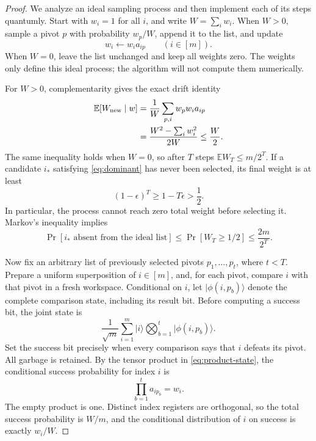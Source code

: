 \documentclass[11pt]{article}
\theoremstyle{definition}
\newcommand{\E}{\mathbb E}
\begin{document}
\begin{proof}
We analyze an ideal sampling process and then implement each of its
steps quantumly. Start with $w_i=1$ for all $i$, and write $W=\sum_iw_i$.
When $W>0$, sample a pivot $p$ with probability $w_p/W$, append it to
the list, and update
\begin{equation}\label{eq:weights}
 w_i\longleftarrow w_i a_{ip}\qquad(i\in[m]).
\end{equation}
When $W=0$, leave the list unchanged and keep all weights zero. The
weights only define this ideal process; the algorithm will not compute
them numerically.

For $W>0$, complementarity gives the exact drift identity
\begin{align}
 \E[W_{\mathrm{new}}\mid w]
 &=\frac{1}{W}\sum_{p,i}w_pw_i a_{ip}\notag\\
 &=\frac{W^2-\sum_iw_i^2}{2W}\le\frac W2.
 \label{eq:drift}
\end{align}
The same inequality holds when $W=0$, so after $T$ steps
$\E W_T\le m/2^T$. If a candidate $i_\ast$ satisfying
\eqref{eq:dominant} has never been selected, its final weight is at
least
\[
 (1-\epsilon)^T\ge1-T\epsilon>\frac12.
\]
In particular, the process cannot reach zero total weight before
selecting it. Markov's inequality implies
\begin{equation}\label{eq:ideal-miss}
 \Pr[i_\ast\text{ absent from the ideal list}]
 \le\Pr[W_T\ge1/2]\le\frac{2m}{2^T}.
\end{equation}

Now fix an arbitrary list of previously selected pivots
$p_1,\ldots,p_t$, where $t<T$. Prepare a uniform superposition of
$i\in[m]$, and, for each pivot, compare $i$ with that pivot in a fresh
workspace. Conditional on $i$, let $\lvert\phi(i,p_b)\rangle$ denote
the complete comparison state, including its result bit. Before
computing a success bit, the joint state is
\begin{equation}\label{eq:product-state}
 \frac1{\sqrt m}\sum_{i=1}^m
  \lvert i\rangle\bigotimes_{b=1}^t
  \lvert\phi(i,p_b)\rangle.
\end{equation}
Set the success bit precisely when every comparison says that $i$
defeats its pivot. All garbage is retained. By the tensor product in
\eqref{eq:product-state}, the conditional success probability for index
$i$ is
\[
 \prod_{b=1}^t a_{i p_b}=w_i.
\]
The empty product is one. Distinct index registers are orthogonal,
so the total success probability is $W/m$, and the conditional
distribution of $i$ on success is exactly $w_i/W$.


\end{proof}
\end{document}
